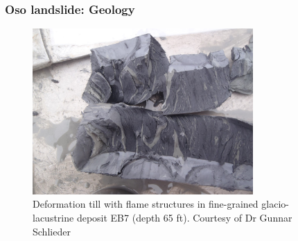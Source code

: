 \documentclass[notes]{beamer}
\begin{document}
\begin{frame}
	\frametitle{Oso landslide: Geology}
	\begin{figure}
		\includegraphics[width=0.75\textwidth]{figs/oso/flame-structures.jpg}
		\caption*{Deformation till with flame structures in fine-grained glacio-lacustrine deposit EB7 (depth 65 ft). Courtesy of Dr Gunnar Schlieder}
	\end{figure}
\end{frame}
\end{document}
